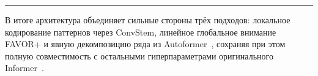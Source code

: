 \rule{\textwidth}{0.4pt}

В итоге архитектура объединяет сильные стороны
трёх подходов: локальное кодирование паттернов через ConvStem, линейное глобальное внимание 
FAVOR+ и явную декомпозицию ряда из Autoformer~\cite{autoformer}, 
сохраняя при этом полную совместимость с остальными гиперпараметрами 
оригинального Informer~\cite{informer}.

        
        



        
